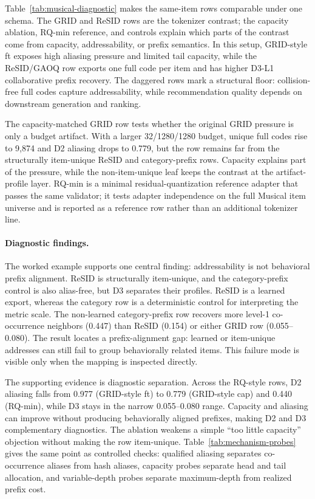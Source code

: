 Table~\ref{tab:musical-diagnostic} makes the same-item rows comparable under
one schema. The GRID and ReSID rows are the tokenizer contrast; the capacity
ablation, RQ-min reference, and controls explain which parts of the contrast
come from capacity, addressability, or prefix semantics. In this setup, GRID-style ft
exposes high aliasing pressure and limited tail capacity, while the ReSID/GAOQ
row exports one full code per item and has higher D3-L1 collaborative prefix
recovery. The daggered rows mark a structural floor: collision-free full codes
capture addressability, while recommendation quality depends on downstream
generation and ranking.

The capacity-matched GRID row tests whether the original GRID pressure is only
a budget artifact. With a larger 32/1280/1280 budget, unique full codes rise to
9,874 and D2 aliasing drops to 0.779, but the row remains far from the
structurally item-unique ReSID and category-prefix rows. Capacity explains part
of the pressure, while the non-item-unique leaf keeps the contrast at the
artifact-profile layer. RQ-min is a
minimal residual-quantization reference adapter that passes the same validator;
it tests adapter independence on the full Musical item universe and is reported
as a reference row rather than an additional tokenizer line.

\paragraph{Diagnostic findings.}
The worked example supports one central finding: addressability is not
behavioral prefix alignment. ReSID is structurally item-unique, and the
category-prefix control is also alias-free, but D3 separates their profiles.
ReSID is a learned export, whereas the category row is a deterministic control
for interpreting the metric scale.
The non-learned category-prefix row recovers more level-1 co-occurrence
neighbors (0.447) than ReSID (0.154) or either GRID row (0.055--0.080). The
result locates a prefix-alignment gap: learned or item-unique addresses can
still fail to group behaviorally related items. This failure mode is visible
only when the mapping is inspected directly.

The supporting evidence is diagnostic separation. Across the RQ-style rows,
D2 aliasing falls from 0.977 (GRID-style ft) to 0.779 (GRID-style cap) and 0.440
(RQ-min), while D3 stays in the narrow 0.055--0.080 range. Capacity and
aliasing can improve without producing behaviorally aligned prefixes, making
D2 and D3 complementary diagnostics. The ablation weakens a simple ``too little
capacity'' objection without making the row item-unique. Table~\ref{tab:mechanism-probes}
gives the same point as controlled checks: qualified aliasing separates
co-occurrence aliases from hash aliases, capacity probes separate head and tail
allocation, and variable-depth probes separate maximum-depth from realized
prefix cost.

